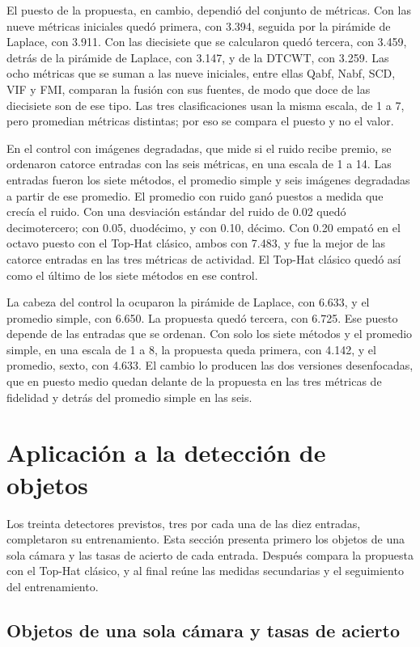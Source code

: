 El puesto de la propuesta, en cambio, dependió del conjunto de métricas. Con las nueve métricas
iniciales quedó primera, con 3.394, seguida por la pirámide de Laplace, con 3.911. Con las diecisiete
que se calcularon quedó tercera, con 3.459, detrás de la pirámide de Laplace, con 3.147, y de la DTCWT,
con 3.259. Las ocho métricas que se suman a las nueve iniciales, entre ellas Qabf, Nabf, SCD, VIF y
FMI, comparan la fusión con sus fuentes, de modo que doce de las diecisiete son de ese tipo. Las tres
clasificaciones usan la misma escala, de 1 a 7, pero promedian métricas distintas; por eso se compara
el puesto y no el valor.

En el control con imágenes degradadas, que mide si el ruido recibe premio, se ordenaron catorce entradas
con las seis métricas, en una escala de 1 a 14. Las entradas fueron los siete métodos, el promedio simple y seis
imágenes degradadas a partir de ese promedio. El promedio con ruido ganó puestos a medida que crecía el
ruido. Con una desviación estándar del ruido de 0.02 quedó decimotercero; con 0.05, duodécimo, y con
0.10, décimo. Con 0.20 empató en el octavo puesto con el Top-Hat clásico, ambos con 7.483, y fue la mejor de las catorce entradas en las tres métricas de
actividad. El Top-Hat clásico quedó así como el último de los siete métodos en ese control.

La cabeza del control la ocuparon la pirámide de Laplace, con 6.633, y el promedio simple, con 6.650.
La propuesta quedó tercera, con 6.725. Ese puesto depende de las entradas que se ordenan. Con
solo los siete métodos y el promedio simple, en una escala de 1 a 8, la propuesta queda primera, con
4.142, y el promedio, sexto, con 4.633. El cambio lo producen las dos versiones desenfocadas, que en
puesto medio quedan delante de la propuesta en las tres métricas de fidelidad y detrás del promedio
simple en las seis.

\section{Aplicación a la detección de objetos}
\label{sec:deteccion}

Los treinta detectores previstos, tres por cada una de las diez entradas, completaron su entrenamiento.
Esta sección presenta primero los objetos de una sola cámara y las tasas de acierto de cada entrada.
Después compara la propuesta con el Top-Hat clásico, y al final reúne las medidas secundarias y el
seguimiento del entrenamiento.

\subsection{Objetos de una sola cámara y tasas de acierto}
\label{sec:res-tasas}

